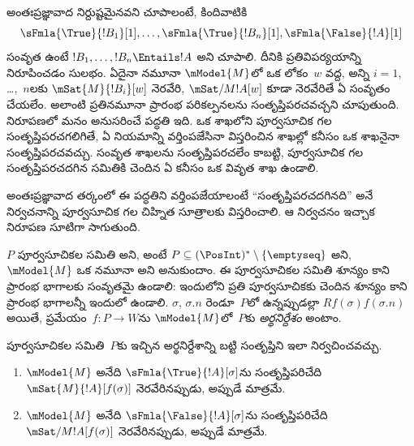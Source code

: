 \documentclass[../../../include/open-logic-section]{subfiles}
\begin{document}


\begin{explain}
  అంతఃప్రజ్ఞావాద 
  నిర్దుష్టమైనవని చూపాలంటే, కిందివాటికి
  \[
  \sFmla{\True}{!B_1}[1], \dots, \sFmla{\True}{!B_n}[1], \sFmla{\False}{!A}[1]
  \]
  సంవృత  ఉంటే
  $!B_1, \dots, !B_n \Entails !A$ అని
  చూపాలి. దీనికి ప్రతివిపర్యయాన్ని నిరూపించడం సులభం.
  ఏదైనా నమూనా $\mModel{M}$లో ఒక లోకం~$w$ వద్ద,
  అన్ని $i=1$, \dots,~$n$లకు $\mSat{M}{!B_i}[w]$
  నెరవేరి, $\mSat/{M}{!A}[w]$ కూడా నెరవేరితే ఏ
   సంవృతం చేయలేం.
  అలాంటి ప్రతినమూనా 
  ప్రారంభ పరికల్పనలను సంతృప్తిపరచవచ్చని చూపుతుంది. నిరూపణలో
  మనం అనుసరించే పద్ధతి ఇది. ఒక  శాఖలోని
  పూర్వసూచిక గల  సంతృప్తిపరచగలిగితే,
  ఏ నియమాన్ని వర్తింపజేసినా విస్తరించిన శాఖల్లో
  కనీసం ఒక శాఖనైనా సంతృప్తిపరచవచ్చు. సంవృత శాఖలను
  సంతృప్తిపరచలేం కాబట్టి,
  పూర్వసూచిక గల 
  సంతృప్తిపరచదగిన సమితికి చెందిన
  ఏ 
  కనీసం ఒక వివృత శాఖ ఉండాలి.

  అంతఃప్రజ్ఞావాద తర్కంలో ఈ పద్ధతిని
  వర్తింపజేయాలంటే ``సంతృప్తిపరచదగినది''
  అనే నిర్వచనాన్ని పూర్వసూచిక గల
  చిహ్నిత సూత్రాలకు విస్తరించాలి.
  ఆ నిర్వచనం ఇచ్చాక నిరూపణ సూటిగా సాగుతుంది.
\end{explain}

\begin{defn}
  $P$ పూర్వసూచికల సమితి అని, అంటే
  $P \subseteq (\PosInt)^*
  \setminus \{\emptyseq\}$ అని,
  $\mModel{M}$ ఒక నమూనా అని అనుకుందాం.
  ఈ పూర్వసూచికల సమితి శూన్యం కాని ప్రారంభ
  భాగాలకు సంవృతమై ఉండాలి: ఇందులోని ప్రతి
  పూర్వసూచికకు చెందిన శూన్యం కాని ప్రారంభ
  భాగాలన్నీ ఇందులో ఉండాలి.
  $\sigma$, $\sigma.n$ రెండూ~$P$లో
  ఉన్నప్పుడల్లా $Rf(\sigma)f(\sigma.n)$
  అయితే, ప్రమేయం~$f\colon P \to W$ను
  $\mModel{M}$లో~$P$కు \emph{అర్థనిర్దేశం} అంటాం.

  పూర్వసూచికల సమితి~$P$కు ఇచ్చిన అర్థనిర్దేశాన్ని బట్టి
  సంతృప్తిని ఇలా నిర్వచించవచ్చు.
  \begin{enumerate}
  \item $\mModel{M}$ అనేది $\sFmla{\True}{!A}[\sigma]$ను
    సంతృప్తిపరిచేది $\mSat{M}{!A}[f(\sigma)]$
    నెరవేరినప్పుడు, అప్పుడే మాత్రమే.
  \item $\mModel{M}$ అనేది $\sFmla{\False}{!A}[\sigma]$ను
    సంతృప్తిపరిచేది $\mSat/{M}{!A}[f(\sigma)]$
    నెరవేరినప్పుడు, అప్పుడే మాత్రమే.
  \end{enumerate}
\end{defn}
\end{document}
